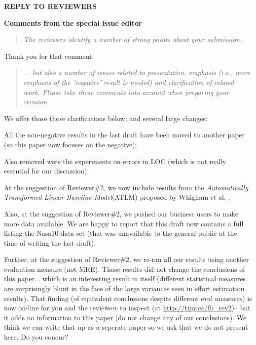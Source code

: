 \newpage
\setcounter{page}{1}
\noindent
    {\bf REPLY TO REVIEWERS}

   \noindent
{\bf Comments from the special issue editor}

\begin{quote}{\em     The reviewers identify a number of strong points about your submission..}\end{quote}

\noindent
Thank you for that comment.

\begin{quote}{\em ... but also a number of issues related to presentation, emphasis (i.e., more emphasis of the 'negative' result is needed) and clarification of related work. Please take these comments into account when preparing your revision.}\end{quote}

\noindent We offer those those clarifications below, and several large changes:
\be
\item All the non-negative results in the last draft have been moved to another paper
  (so this paper now focuses on the negative);
\item Also removed were the experiments on errors in LOC (which is
  not really essential for our discussion).
  
\item
  At the suggestion of Reviewer\#2, we now include results from the
  \textit{Automatically Transformed Linear Baseline Model}(ATLM) proposed by Whigham et al. \cite{whigham15}.
\item Also, at the suggestion of Reviewer\#2, we pushed our business users to make
  more data available. We are happy to report that this draft now contains a full listing the Nasa10
  data set (that was unavailable to the general public at the time of writing the last draft).
\item Further, at the suggestion of Reviewer\#2, we re-ran all our results
  using another evalaution measure (not MRE). Those results did not change
  the conclusions of this paper... which is an interesting result in itself
  (different statistical measures are surprisingly blunt in the face
  of the large variances seen in effort estimation results). That finding (of
  equivalent conclusions despite different eval measures) is now on-line for
  you and the reviewers to inspect (at \url{http://tiny.cc/fb_rev2})-- but it adds no information to this
  paper (do not change any of our conclusions). We think we can write
  that up as a seperate paper so we ask that we do not
  present here.  Do you concur?
  \ee
  
